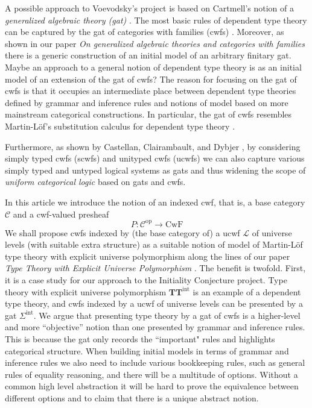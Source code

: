 \documentclass[11pt,a4paper]{article}
\theoremstyle{definition}
\newcommand{\op}{\mathrm{op}}
\newcommand{\MB}[1]{{\color{red}{#1}}}
\def\L{{\mathcal{L}}}
\def\CwF{\mathrm{CwF}}
\def\C{\mathcal{C}}
\def\Sigmaint{\Sigma^\mathrm{int}}
\def\TTint{\mathbf{TT}^\mathrm{int}}
\begin{document}
A possible approach to Voevodsky's project is based on Cartmell's notion of a {\em generalized algebraic theory (gat)} \cite{cartmell:phd,cartmell:apal}. The most basic rules of dependent type theory can be captured by the gat of categories with families (cwfs) \cite{dybjer:torino}. Moreover, as shown in our paper {\em On generalized algebraic theories and categories with families} \cite{bezem:hofmann} there is a generic construction of an initial model of an arbitrary finitary gat. 
Maybe an approach to a general notion of dependent type theory is as an initial model of an extension of the gat of cwfs? The reason for focusing on the gat of cwfs is that it occupies an intermediate place between dependent type theories defined by grammar and inference rules and notions of model based on more mainstream categorical constructions. In particular, the gat of cwfs resembles Martin-Löf's substitution calculus for dependent type theory \cite{martinlof:gbg92,tasistro:lic}.

Furthermore, as shown by Castellan, Clairambault, and Dybjer \cite{castellan:lambek}, by considering simply typed cwfs (scwfs) and unityped cwfs (ucwfs) we can also capture various simply typed and untyped logical systems as gats and thus widening the scope of {\em uniform categorical logic} based on gats and cwfs. \MB{Cf. logical frameworks?}

In this article we introduce the notion of an indexed cwf, that is, a base category $\C$ and a cwf-valued presheaf
$$
P : \C^\op \to \CwF
$$
We shall propose cwfs indexed by (the base category of) a ucwf $\L$ of universe levels (with suitable extra structure) as a suitable notion of model of Martin-Löf type theory with explicit universe polymorphism along the lines of our paper {\em Type Theory with Explicit Universe Polymorphism} \cite{BezemCDE22}. The benefit is twofold. First, it is a case study for our approach to the Initiality Conjecture project. Type theory with explicit universe polymorphism $\TTint$ is an example of a dependent type theory, and cwfs indexed by a ucwf of universe levels can be presented by a gat $\Sigmaint$. We argue that presenting type theory by a gat of cwfs is a higher-level and more ``objective'' notion than one presented by grammar and inference rules. This is because the gat only records the ``important" rules and highlights categorical structure. When building initial models in terms of grammar and inference rules we also need to include various bookkeeping rules, such as general rules of equality reasoning, and there will be a multitude of options. Without a common high level abstraction it will be hard to prove the equivalence between different options and to claim that there is a unique abstract notion. 
\end{document}
